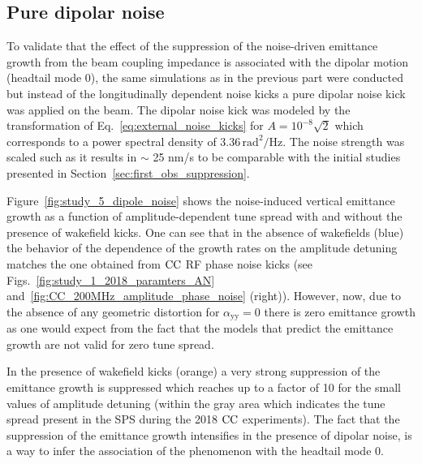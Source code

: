 

\subsection{Pure dipolar noise}\label{subsec:dipole_noise}
To validate that the effect of the suppression of the noise-driven emittance growth from the beam coupling impedance is associated with the dipolar motion (headtail mode 0), the same simulations as in the previous part were conducted but instead of the longitudinally dependent noise kicks a pure dipolar noise kick was applied on the beam. The dipolar noise kick was modeled by the transformation of Eq.~\eqref{eq:external_noise_kicks} for $A=10^{-8} \sqrt{2}$ which corresponds to a power spectral density of 3.36\,$\mathrm{rad^2/Hz}$. The noise strength was scaled such as it results in $\sim$ 25 nm/s to be comparable with the initial studies presented in Section~\ref{sec:first_obs_suppression}.

Figure~\ref{fig:study_5_dipole_noise} shows the noise-induced vertical emittance growth as a function of amplitude-dependent tune spread with and without the presence of wakefield kicks. One can see that in the absence of wakefields (blue) the behavior of the dependence of the growth rates on the amplitude detuning matches the one obtained from ${\mathrm{CC}}$ RF phase noise kicks (see Figs.~\ref{fig:study_1_2018_paramters_AN} and~\ref{fig:CC_200MHz_amplitude_phase_noise} (right)). However, now, due to the absence of any geometric distortion for $\alpha_\mathrm{yy}=0$ there is zero emittance growth as one would expect from the fact that the models that predict the emittance growth are not valid for zero tune spread.

In the presence of wakefield kicks (orange) a very strong suppression of the emittance growth is suppressed which reaches up to a factor of 10 for the small values of amplitude detuning (within the gray area which indicates the tune spread present in the SPS during the 2018 ${\mathrm{CC}}$ experiments). The fact that the suppression of the emittance growth intensifies in the presence of dipolar noise, is a way to infer the association of the phenomenon with the headtail mode 0.

